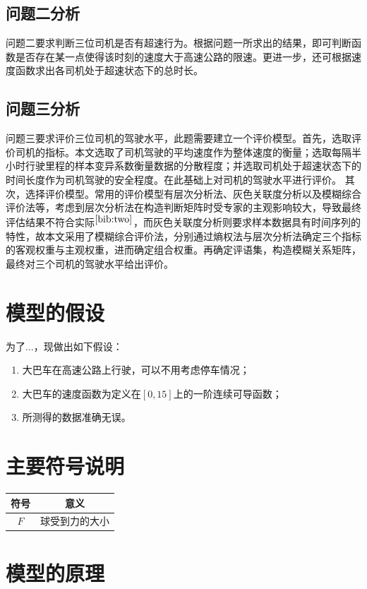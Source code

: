 \documentclass[bwprint]{cumcmthesis}
\begin{document}
        \subsection{问题二分析}
        问题二要求判断三位司机是否有超速行为。根据问题一所求出的结果，即可判断函数是否存在某一点使得该时刻的速度大于高速公路的限速。更进一步，还可根据速度函数求出各司机处于超速状态下的总时长。
        \subsection{问题三分析}
        问题三要求评价三位司机的驾驶水平，此题需要建立一个评价模型。首先，选取评价司机的指标。本文选取了司机驾驶的平均速度作为整体速度的衡量；选取每隔半小时行驶里程的样本变异系数衡量数据的分散程度；并选取司机处于超速状态下的时间长度作为司机驾驶的安全程度。在此基础上对司机的驾驶水平进行评价。
        其次，选择评价模型。常用的评价模型有层次分析法、灰色关联度分析以及模糊综合评价法等，考虑到层次分析法在构造判断矩阵时受专家的主观影响较大，导致最终评估结果不符合实际$^{\cite{bib:two}}$，而灰色关联度分析则要求样本数据具有时间序列的特性，故本文采用了模糊综合评价法，分别通过熵权法与层次分析法确定三个指标的客观权重与主观权重，进而确定组合权重。再确定评语集，构造模糊关系矩阵，最终对三个司机的驾驶水平给出评价。
    \section{模型的假设}
        为了...，现做出如下假设：
        \begin{enumerate}
            \item 大巴车在高速公路上行驶，可以不用考虑停车情况；
            \item 大巴车的速度函数为定义在$[0,15]$上的一阶连续可导函数；
            \item 所测得的数据准确无误。
        \end{enumerate}
    \section{主要符号说明}
        \begin{center}
            \begin{tabular}{cc}
                \hline
                符号	&  意义 \\ \hline
                $F$    & 球受到力的大小 \\ \hline
            \end{tabular}
        \end{center}
    \section{模型的原理}
\end{document}
